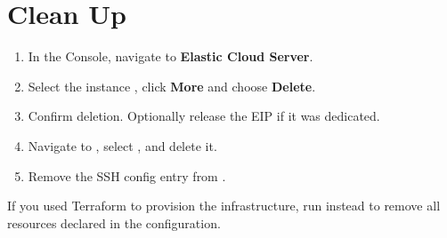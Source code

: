 \documentclass{guide}
\begin{document}
\begin{code}
\end{code}

\section{Clean Up}

\begin{objectives}
\end{objectives}

\stepbystep
\begin{enumerate}
  \item In the Console, navigate to \textbf{Elastic Cloud Server}.
  \item Select the instance , click \textbf{More} and
        choose \textbf{Delete}.
  \item Confirm deletion. Optionally release the EIP if it was dedicated.
  \item Navigate to ,
        select , and delete it.
  \item Remove the SSH config entry from .
\end{enumerate}

\begin{warning}
If you used Terraform to provision the infrastructure, run
 instead to remove all resources declared in the
configuration.
\end{warning}

\end{document}
